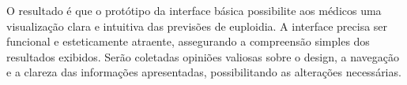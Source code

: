 O resultado é que o protótipo da interface básica possibilite aos médicos uma visualização clara e intuitiva das previsões de euploidia. A interface precisa ser funcional e esteticamente atraente, assegurando a compreensão simples dos resultados exibidos. Serão coletadas opiniões valiosas sobre o design, a navegação e a clareza das informações apresentadas, possibilitando as alterações necessárias.
